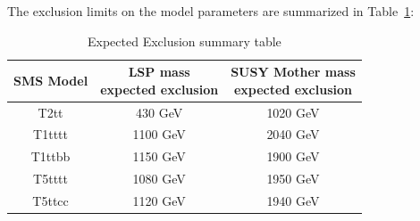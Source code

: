 The exclusion limits on the model parameters are summarized in Table~\ref{tab:c4limitsummary}:

\begin{table}[htbp]
\fontsize{10 pt}{1.2 em}
\selectfont
\begin{centering}
\caption{\label{tab:c4limitsummary} Expected Exclusion summary table}
\hspace*{-4ex}
\begin{tabular}{|c|c|c|}
\hline
SMS Model & \specialcell{LSP mass \\ expected exclusion} & \specialcell{SUSY Mother mass \\ expected exclusion} \\
\hline
T2tt & 430 GeV & 1020 GeV \\
\hline
T1tttt & 1100 GeV & 2040 GeV \\
\hline
T1ttbb & 1150 GeV & 1900 GeV \\
\hline
T5tttt & 1080 GeV & 1950 GeV \\
\hline
T5ttcc & 1120 GeV & 1940 GeV \\
\hline
\end{tabular}
\par\end{centering}
\end{table}
